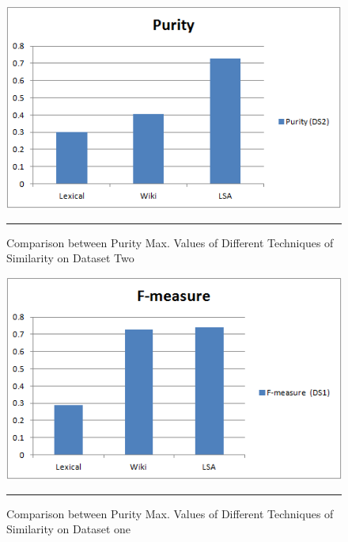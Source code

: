 \begin{figure}[htbp]
	\centering
		\includegraphics{./Figures/Purity_DS2_1.png}
		\rule{35em}{0.5pt}
	\caption[Comparison between Purity Max. Values of Different Techniques of Similarity on Dataset Two]{Comparison between Purity Max. Values of Different Techniques of Similarity on Dataset Two}
	\label{fig:F121}
\end{figure}
\clearpage
\begin{figure}[htbp]
	\centering
		\includegraphics{./Figures/F_DS1_1.png}
		\rule{35em}{0.5pt}
	\caption[Comparison between Purity Max. Values of Different Techniques of Similarity on Dataset one]{Comparison between Purity Max. Values of Different Techniques of Similarity on Dataset one}
	\label{fig:F50}
\end{figure}

